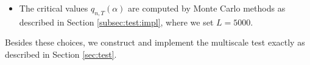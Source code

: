 \documentclass[a4paper,12pt]{article}
\begin{document}
\begin{itemize}[leftmargin=0.5cm]
\item The critical values $q_{n, T}(\alpha)$ are computed by Monte Carlo methods as described in Section \ref{subsec:test:impl}, where we set $L=5000$.
\end{itemize}
Besides these choices, we construct and implement the multiscale test exactly as described in Section \ref{sec:test}.  
\end{document}
